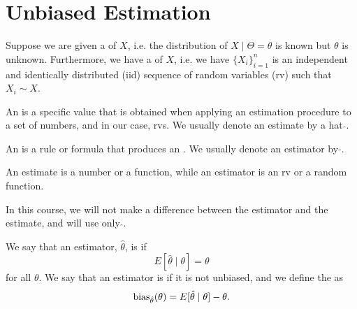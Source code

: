 \documentclass[notoc,notitlepage]{tufte-book}
\begin{document}
\section{Unbiased Estimation}%
\label{sec:unbiased_estimation}

Suppose we are given a   of
$X$, i.e. the distribution of $X \mid \Theta = \theta$ is known but $\theta$ is
unknown. Furthermore, we have a  of $X$, i.e. we have $\{
X_i \}_{i=1}^{n}$ is an independent and identically distributed (iid) sequence
of random variables (rv) such that $X_i \sim X$.

\begin{defn}[Estimate]\label{defn:estimate}
  An  is a specific value that is obtained when applying an
  estimation procedure to a set of numbers, and in our case, rvs. We usually
  denote an estimate by a hat $\hat{}$.
\end{defn}

\begin{defn}[Estimator]\label{defn:estimator}
  An  is a rule or formula that produces an
  . We usually denote an estimator by $\tilde{}$.
\end{defn}

\begin{note}
  An estimate is a number or a function, while an estimator is an rv or a random
  function.
\end{note}

\begin{remark}
  In this course, we will not make a difference between the estimator and the
  estimate, and will use only $\hat{}$.
\end{remark}

\begin{defn}\label{defn:biased_and_unbiased_estimator}
  We say that an estimator, $\hat{\theta}$, is  if
  \begin{equation*}
    E[\hat{\theta} \mid \theta] = \theta
  \end{equation*}
  for all $\theta$. We say that an estimator is  if it is not
  unbiased, and we define the  as
  \begin{equation*}
    \operatorname{bias}_{\hat{\theta}}(\theta) = E[\hat{\theta} \mid \theta] - \theta.
  \end{equation*}
\end{defn}
\end{document}
